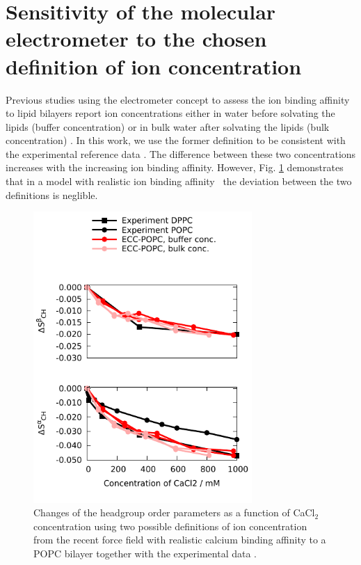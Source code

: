 \documentclass[journal=jpcbfk]{achemso}
\begin{document}
\section{Sensitivity of the molecular electrometer to the chosen definition of ion concentration}\label{concentrationDEFsection}
Previous studies using the electrometer concept to assess the ion binding affinity to lipid
bilayers report ion concentrations either in water before solvating the lipids (buffer concentration) \cite{akutsu81,roux90,catte16}
or in bulk water after solvating the lipids (bulk concentration) \cite{altenbach84,melcr18}.
In this work, we use the former definition to be consistent with the experimental reference data \cite{roux90}. The difference between these two concentrations increases
with the increasing ion binding affinity. However, Fig. \ref{concentrationDEFfigure} demonstrates that 
in a model with realistic ion binding affinity~\cite{melcr18} the deviation between the two definitions is neglible.
\begin{figure}[]
  \centering
  \includegraphics[width=8.3cm]{../Figs/OP_ECC_POPC_DPPC_water_conc2_dppc_bulk.pdf}
  \caption{\label{concentrationDEFfigure}
    Changes of the headgroup order parameters as a function of CaCl$_2$ concentration using
    two possible definitions of ion concentration from the recent force field
    with realistic calcium binding affinity to a POPC bilayer \cite{melcr18}
    together with the experimental data \cite{akutsu81,altenbach84}. 
  }
\end{figure}
\end{document}

